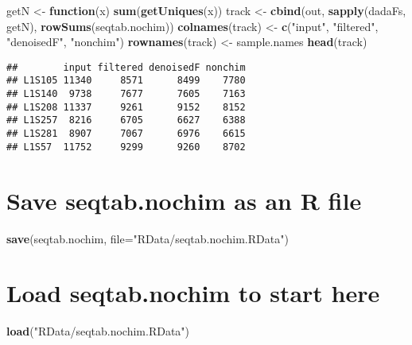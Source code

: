 \documentclass[
]{article}
\newenvironment{Shaded}{\begin{snugshade}}{\end{snugshade}}
\newcommand{\AttributeTok}[1]{\textcolor[rgb]{0.13,0.29,0.53}{#1}}
\newcommand{\ControlFlowTok}[1]{\textcolor[rgb]{0.13,0.29,0.53}{\textbf{#1}}}
\newcommand{\FunctionTok}[1]{\textcolor[rgb]{0.13,0.29,0.53}{\textbf{#1}}}
\newcommand{\NormalTok}[1]{#1}
\newcommand{\OtherTok}[1]{\textcolor[rgb]{0.56,0.35,0.01}{#1}}
\newcommand{\StringTok}[1]{\textcolor[rgb]{0.31,0.60,0.02}{#1}}
\begin{document}
\begin{Shaded}
\begin{Highlighting}[]
\NormalTok{getN }\OtherTok{\textless{}{-}} \ControlFlowTok{function}\NormalTok{(x) }\FunctionTok{sum}\NormalTok{(}\FunctionTok{getUniques}\NormalTok{(x))}
\NormalTok{track }\OtherTok{\textless{}{-}} \FunctionTok{cbind}\NormalTok{(out, }\FunctionTok{sapply}\NormalTok{(dadaFs, getN), }\FunctionTok{rowSums}\NormalTok{(seqtab.nochim))}
\FunctionTok{colnames}\NormalTok{(track) }\OtherTok{\textless{}{-}} \FunctionTok{c}\NormalTok{(}\StringTok{"input"}\NormalTok{, }\StringTok{"filtered"}\NormalTok{, }\StringTok{"denoisedF"}\NormalTok{, }\StringTok{"nonchim"}\NormalTok{)}
\FunctionTok{rownames}\NormalTok{(track) }\OtherTok{\textless{}{-}}\NormalTok{ sample.names}
\FunctionTok{head}\NormalTok{(track)}
\end{Highlighting}
\end{Shaded}

\begin{verbatim}
##        input filtered denoisedF nonchim
## L1S105 11340     8571      8499    7780
## L1S140  9738     7677      7605    7163
## L1S208 11337     9261      9152    8152
## L1S257  8216     6705      6627    6388
## L1S281  8907     7067      6976    6615
## L1S57  11752     9299      9260    8702
\end{verbatim}

\hypertarget{save-seqtab.nochim-as-an-r-file}{%
\section{Save seqtab.nochim as an R
file}\label{save-seqtab.nochim-as-an-r-file}}

\begin{Shaded}
\begin{Highlighting}[]
\FunctionTok{save}\NormalTok{(seqtab.nochim, }\AttributeTok{file=}\StringTok{"RData/seqtab.nochim.RData"}\NormalTok{)}
\end{Highlighting}
\end{Shaded}

\hypertarget{load-seqtab.nochim-to-start-here}{%
\section{Load seqtab.nochim to start
here}\label{load-seqtab.nochim-to-start-here}}

\begin{Shaded}
\begin{Highlighting}[]
\FunctionTok{load}\NormalTok{(}\StringTok{"RData/seqtab.nochim.RData"}\NormalTok{)}
\end{Highlighting}
\end{Shaded}
\end{document}
